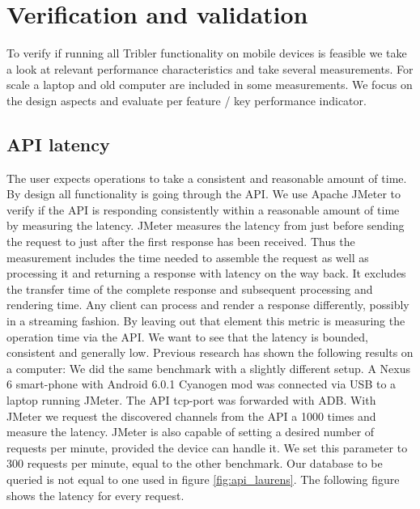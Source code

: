 \chapter{Verification and validation}
To verify if running all Tribler functionality on mobile devices is feasible we take a look at relevant performance characteristics and take several measurements.
For scale a laptop and old computer are included in some measurements.
We focus on the design aspects and evaluate per feature / key performance indicator.


\section{API latency}
The user expects operations to take a consistent and reasonable amount of time.
By design all functionality is going through the API.
We use Apache JMeter to verify if the API is responding consistently within a reasonable amount of time by measuring the latency.
JMeter measures the latency from just before sending the request to just after the first response has been received. \cite{jmeter_glossary}
Thus the measurement includes the time needed to assemble the request as well as processing it and returning a response with latency on the way back.
It excludes the transfer time of the complete response and subsequent processing and rendering time.
Any client can process and render a response differently, possibly in a streaming fashion.
By leaving out that element this metric is measuring the operation time via the API.
We want to see that the latency is bounded, consistent and generally low.
Previous research has shown the following results on a computer:
We did the same benchmark with a slightly different setup.
A Nexus 6 smart-phone with Android 6.0.1 Cyanogen mod was connected via USB to a laptop running JMeter.
The API tcp-port was forwarded with ADB.
With JMeter we request the discovered channels from the API a 1000 times and measure the latency.
JMeter is also capable of setting a desired number of requests per minute, provided the device can handle it.
We set this parameter to 300 requests per minute, equal to the other benchmark.
Our database to be queried is not equal to one used in figure \ref{fig:api_laurens}.
The following figure shows the latency for every request.

